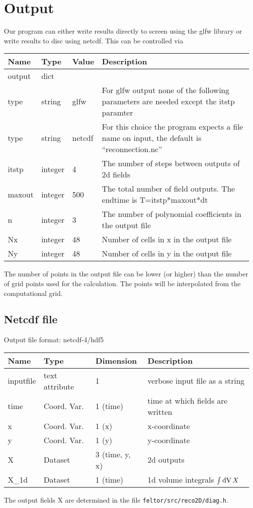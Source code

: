 \section{Output}
Our program can either write results directly to screen using the glfw library
or write results to disc using netcdf.
This can be controlled via
\begin{longtable}{lllp{9cm}}
\toprule
\rowcolor{gray!50}\textbf{Name} &  \textbf{Type} & \textbf{Value}  & \textbf{Description}  \\ \midrule
output & dict & & \\
\qquad type & string & glfw  &  For glfw output none of the following parameters are needed except the itstp paramter\\
\qquad type & string & netcdf  & For this choice the program expects a file name on input, the default is ``reconnection.nc'' \\
\qquad itstp  & integer& 4 & The number of steps between outputs of 2d fields \\
\qquad maxout  & integer& 500 & The total number of field outputs. The endtime is T=itstp*maxout*dt \\
\qquad n  & integer & 3  & The number of polynomial coefficients in the output file\\
\qquad Nx & integer & 48 & Number of cells in x in the output file \\
\qquad Ny & integer & 48 & Number of cells in y in the output file \\
\bottomrule
\end{longtable}
The number of points in the output file can be lower (or higher) than the number of
grid points used for the calculation. The points will be interpolated from the
computational grid.
\subsection{Netcdf file}
Output file format: netcdf-4/hdf5

\begin{longtable}{lll>{\RaggedRight}p{7cm}}
\toprule
\rowcolor{gray!50}\textbf{Name} &  \textbf{Type} & \textbf{Dimension} & \textbf{Description}  \\ \midrule
inputfile        & text attribute & 1 & verbose input file as a string \\
time             & Coord. Var. & 1 (time) & time at which fields are written \\
x                & Coord. Var. & 1 (x) & x-coordinate  \\
y                & Coord. Var. & 1 (y) & y-coordinate \\
X                & Dataset & 3 (time, y, x) & 2d outputs \\
X\_1d            & Dataset & 1 (time) & 1d volume integrals $\int \mathrm{dV}\, X$ \\
\bottomrule
\end{longtable}
The output fields X are determined in the file \texttt{feltor/src/reco2D/diag.h}.



